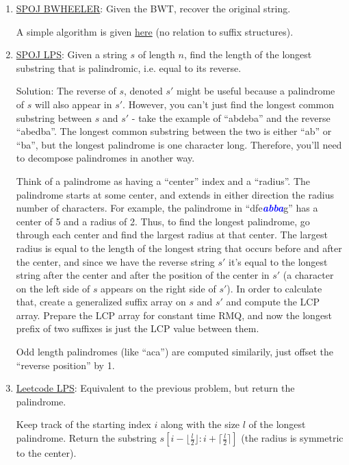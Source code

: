 \documentclass[11pt, oneside]{article}
\newcommand{\emphasis}[1]{\textcolor{blue}{\textbf{\textit{#1}}}}
\begin{document}
\begin{enumerate}
  \item \href{http://www.spoj.com/problems/BWHEELER/}{SPOJ BWHEELER}:
  Given the BWT, recover the original string.

  A simple algorithm is given \href{https://www.cs.helsinki.fi/u/tpkarkka/opetus/12s/spa/lecture11.pdf}{here} (no relation to suffix structures).

  \item \href{https://www.spoj.com/problems/LPS/}{SPOJ LPS}:
  Given a string \( s \) of length \( n \), find the length of the longest substring that is palindromic,
  i.e. equal to its reverse.

  Solution: The reverse of \( s \), denoted \( s' \) might be useful because a palindrome of \( s \)
  will also appear in \( s' \). However, you can't just find the longest common substring
  between \( s \) and \( s' \) - take the example of ``abdeba'' and the reverse ``abedba''.
  The longest common substring between the two is either ``ab'' or ``ba'', but the longest palindrome
  is one character long. Therefore, you'll need to decompose palindromes in another way.

  Think of a palindrome as having a ``center'' index and a ``radius''.
  The palindrome starts at some center, and extends in either direction the radius number of characters.
  For example, the palindrome in ``dfe\emphasis{abba}g'' has a center of 5 and a radius of 2.
  Thus, to find the longest palindrome, go through each center and find the largest radius at that center.
  The largest radius is equal to the length of the longest string that occurs before and after the center,
  and since we have the reverse string \( s' \) it's equal to the longest string after the center
  and after the position of the center in \( s' \)
  (a character on the left side of \( s \) appears on the right side of \( s' \)).
  In order to calculate that, create a generalized suffix array on \( s \) and \( s' \)
  and compute the LCP array. Prepare the LCP array for constant time RMQ, and
  now the longest prefix of two suffixes is just the LCP value between them.

  Odd length palindromes (like ``aca'') are computed similarily, just offset the ``reverse position'' by 1.

  \item \href{https://leetcode.com/problems/longest-palindromic-substring/}{Leetcode LPS}:
  Equivalent to the previous problem, but return the palindrome.

  Keep track of the starting index \( i \) along with the size \( l \) of the longest palindrome.
  Return the substring \( s[i - \lfloor \frac{l}{2} \rfloor: i + \lceil \frac{l}{2} \rceil] \) (the radius is symmetric to the center).


\end{enumerate}
\end{document}
